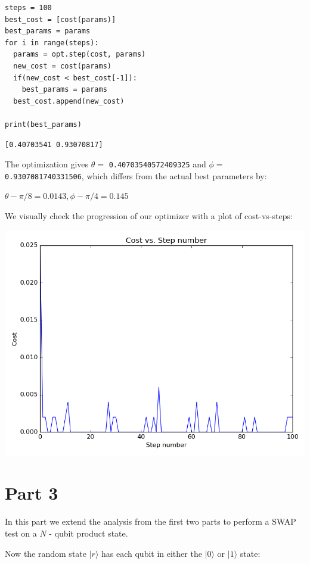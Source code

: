 \documentclass[11pt]{article}
\begin{document}
\begin{verbatim}
steps = 100
best_cost = [cost(params)]
best_params = params
for i in range(steps):
  params = opt.step(cost, params)
  new_cost = cost(params)
  if(new_cost < best_cost[-1]):
    best_params = params
  best_cost.append(new_cost)

print(best_params)
\end{verbatim}

\begin{verbatim}
[0.40703541 0.93070817]
\end{verbatim}


The optimization gives \(\theta =\) \texttt{0.40703540572409325} and \(\phi =\) \texttt{0.9307081740331506}, which differs from the actual best parameters by:

$\theta - \pi/8 = 0.0143, \phi - \pi/4 = 0.145$


\pagebreak

We visually check the progression of our optimizer with a plot of cost-vs-steps:

\begin{center}
\includegraphics[width=.9\linewidth]{images/rotosolve.png}
\end{center}


\section{Part 3}
\label{sec:org0ebf21d}

In this part we extend the analysis from the first two parts to perform a SWAP test on a \(N\) - qubit product state.

Now the random state \(|r\rangle\) has each qubit in either the \(|0\rangle\) or \(|1\rangle\) state:
\end{document}
